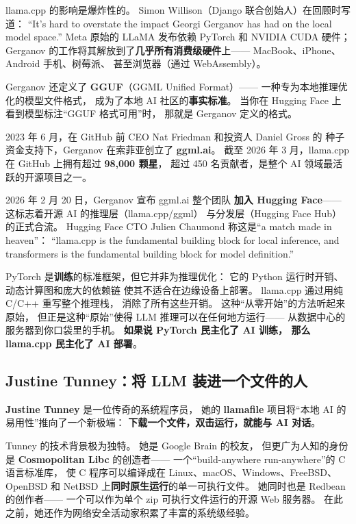 llama.cpp 的影响是爆炸性的。
Simon Willison（Django 联合创始人）在回顾时写道：
``It's hard to overstate the impact Georgi Gerganov has had on the local model space.''
Meta 原始的 LLaMA 发布依赖 PyTorch 和 NVIDIA CUDA 硬件；
Gerganov 的工作将其解放到了\textbf{几乎所有消费级硬件}上——
MacBook、iPhone、Android 手机、树莓派、
甚至浏览器（通过 WebAssembly）。

Gerganov 还定义了 \textbf{GGUF}（GGML Unified Format）——
一种专为本地推理优化的模型文件格式，
成为了本地 AI 社区的\textbf{事实标准}。
当你在 Hugging Face 上看到模型标注``GGUF 格式可用''时，
那就是 Gerganov 定义的格式。

2023 年 6 月，在 GitHub 前 CEO Nat Friedman 和投资人 Daniel Gross 的
种子资金支持下，Gerganov 在索菲亚创立了 \textbf{ggml.ai}。
截至 2026 年 3 月，llama.cpp 在 GitHub 上拥有超过 \textbf{98,000 颗星}，
超过 450 名贡献者，是整个 AI 领域最活跃的开源项目之一。

2026 年 2 月 20 日，Gerganov 宣布 ggml.ai 整个团队
\textbf{加入 Hugging Face}——
这标志着开源 AI 的推理层（llama.cpp/ggml）
与分发层（Hugging Face Hub）的正式合流。
Hugging Face CTO Julien Chaumond 称这是``a match made in heaven''：
``llama.cpp is the fundamental building block for local inference,
and transformers is the fundamental building block for model definition.''

\begin{whybox}
PyTorch 是\textbf{训练}的标准框架，但它并非为推理优化：
它的 Python 运行时开销、动态计算图和庞大的依赖链
使其不适合在边缘设备上部署。
llama.cpp 通过用纯 C/C++ 重写整个推理栈，
消除了所有这些开销。
这种``从零开始''的方法听起来原始，
但正是这种``原始''使得 LLM 推理可以在任何地方运行——
从数据中心的服务器到你口袋里的手机。
\textbf{如果说 PyTorch 民主化了 AI 训练，
那么 llama.cpp 民主化了 AI 部署}。
\end{whybox}


\subsection{Justine Tunney：将 LLM 装进一个文件的人}
\label{subsec:tunney}

\textbf{Justine Tunney} 是一位传奇的系统程序员，
她的 \textbf{llamafile} 项目将``本地 AI 的易用性''推向了一个新极端：
\textbf{下载一个文件，双击运行，就能与 AI 对话}。

Tunney 的技术背景极为独特。
她是 Google Brain 的校友，
但更广为人知的身份是 \textbf{Cosmopolitan Libc} 的创造者——
一个``build-anywhere run-anywhere''的 C 语言标准库，
使 C 程序可以编译成在 Linux、macOS、Windows、FreeBSD、
OpenBSD 和 NetBSD 上\textbf{同时原生运行}的单一可执行文件。
她同时也是 Redbean 的创作者——
一个可以作为单个 zip 可执行文件运行的开源 Web 服务器。
在此之前，她还作为网络安全活动家积累了丰富的系统级经验。

